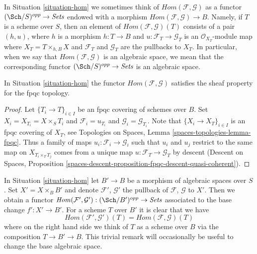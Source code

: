 \noindent
In Situation \ref{situation-hom} we sometimes think of
$\mathit{Hom}(\mathcal{F}, \mathcal{G})$ as a functor
$(\Sch/S)^{opp} \to \textit{Sets}$
endowed with a morphism
$\mathit{Hom}(\mathcal{F}, \mathcal{G}) \to B$.
Namely, if $T$ is a scheme over $S$, then an element of
$\mathit{Hom}(\mathcal{F}, \mathcal{G})(T)$ consists of a pair
$(h, u)$, where $h$ is a morphism $h : T \to B$ and
$u : \mathcal{F}_T \to \mathcal{G}_T$ is an $\mathcal{O}_{X_T}$-module
map where $X_T = T \times_{h, B} X$ and $\mathcal{F}_T$ and $\mathcal{G}_T$
are the pullbacks to $X_T$. In particular, when we say
that $\mathit{Hom}(\mathcal{F}, \mathcal{G})$ is an algebraic space,
we mean that the corresponding functor
$(\Sch/S)^{opp} \to \textit{Sets}$ is an algebraic space.

\begin{lemma}
\label{lemma-hom-sheaf}
In Situation \ref{situation-hom} the functor
$\mathit{Hom}(\mathcal{F}, \mathcal{G})$ 
satisfies the sheaf property for the fpqc topology.
\end{lemma}

\begin{proof}
Let $\{T_i \to T\}_{i \in I}$ be an fpqc covering of schemes over $B$.
Set $X_i = X_{T_i} = X \times_S T_i$ and $\mathcal{F}_i = u_{T_i}$
and $\mathcal{G}_i = \mathcal{G}_{T_i}$.
Note that $\{X_i \to X_T\}_{i \in I}$ is an fpqc covering of $X_T$, see
Topologies on Spaces, Lemma \ref{spaces-topologies-lemma-fpqc}.
Thus a family of maps $u_i : \mathcal{F}_i \to \mathcal{G}_i$
such that $u_i$ and $u_j$ restrict to the same map on
$X_{T_i \times_T T_j}$ comes from a unique map
$u : \mathcal{F}_T \to \mathcal{G}_T$ by descent
(Descent on Spaces, Proposition
\ref{spaces-descent-proposition-fpqc-descent-quasi-coherent}).
\end{proof}

\begin{remark}
\label{remark-hom-base-change}
In Situation \ref{situation-hom} let $B' \to B$ be a morphism of
algebraic spaces over $S$. Set $X' = X \times_B B'$ and denote
$\mathcal{F}'$, $\mathcal{G}'$ the pullback of
$\mathcal{F}$, $\mathcal{G}$ to $X'$. Then we obtain a functor
$\mathit{Hom}(\mathcal{F}', \mathcal{G}') : (\Sch/B')^{opp} \to \textit{Sets}$
associated to the base change $f' : X' \to B'$. For a scheme $T$ over $B'$
it is clear that we have
$$
\mathit{Hom}(\mathcal{F}', \mathcal{G}')(T) =
\mathit{Hom}(\mathcal{F}, \mathcal{G})(T)
$$
where on the right hand side we think of $T$ as a scheme over $B$
via the composition $T \to B' \to B$. This trivial remark
will occasionally be useful to change the base algebraic space.
\end{remark}

